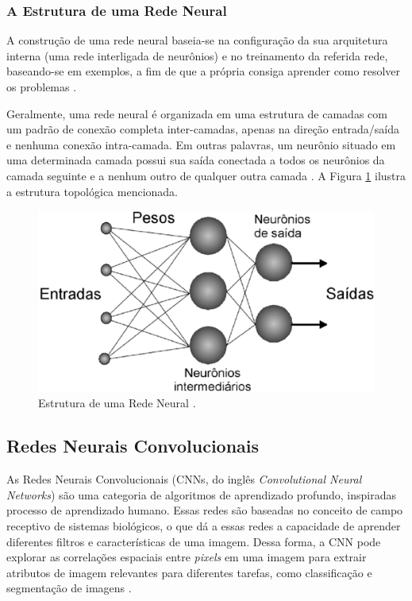 \documentclass[12pt]{article}
\begin{document}
\subsubsection{A Estrutura de uma Rede Neural}

A construção de uma rede neural baseia-se na configuração da sua arquitetura interna (uma rede interligada de neurônios) e no treinamento da referida rede, baseando-se em exemplos, a fim de que a própria consiga aprender como resolver os problemas \cite{hassoun1995fundamentals}.

Geralmente, uma rede neural é organizada em uma estrutura de camadas com um padrão de conexão completa inter-camadas, apenas na direção entrada/saída e nenhuma conexão intra-camada. Em outras palavras, um neurônio situado em uma determinada camada possui sua saída conectada a todos os neurônios da camada seguinte e a nenhum outro de qualquer outra camada \cite{hassoun1995fundamentals}. A Figura \ref{fig:rede_neural} ilustra a estrutura topológica mencionada.

\begin{figure}[!ht]
    \centering
    \includegraphics[width=0.6\textheight]{figures/EstruturaRedeNeural.png}
    \caption{Estrutura de uma Rede Neural \cite{daalvaro}.}
    \label{fig:rede_neural}
\end{figure}


\subsection{Redes Neurais Convolucionais}

As Redes Neurais Convolucionais (CNNs, do inglês \textit{Convolutional Neural Networks}) são uma categoria de algoritmos de aprendizado profundo, inspiradas processo de aprendizado humano. Essas redes são baseadas no conceito de campo receptivo de sistemas biológicos, o que dá a essas redes a capacidade de aprender diferentes filtros e características de uma imagem. Dessa forma, a CNN pode explorar as correlações espaciais entre \textit{pixels} em uma imagem para extrair atributos de imagem relevantes para diferentes tarefas, como classificação e segmentação de imagens \cite{Lecun1998,Guo2016,Ponti2017}.
\end{document}
